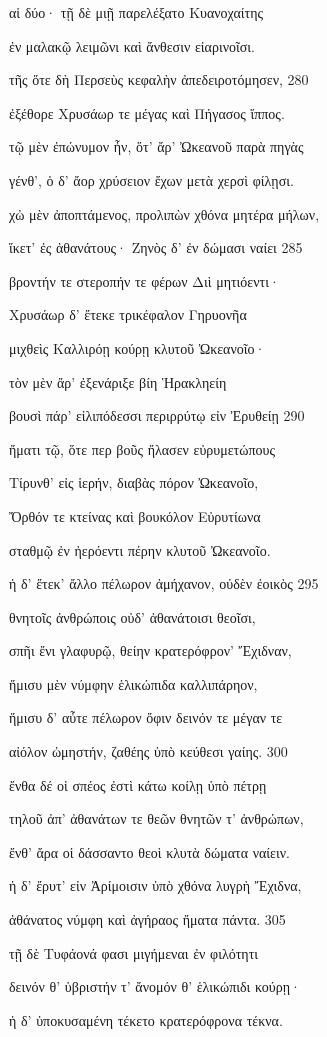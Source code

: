 αἱ δύο· τῇ δὲ μιῇ παρελέξατο Κυανοχαίτης 

ἐν μαλακῷ λειμῶνι καὶ ἄνθεσιν εἰαρινοῖσι. 

τῆς ὅτε δὴ Περσεὺς κεφαλὴν ἀπεδειροτόμησεν, 280 

ἐξέθορε Χρυσάωρ τε μέγας καὶ Πήγασος ἵππος.

τῷ μὲν ἐπώνυμον ἦν, ὅτ' ἄρ' Ὠκεανοῦ παρὰ πηγὰς

γένθ', ὁ δ' ἄορ χρύσειον ἔχων μετὰ χερσὶ φίλῃσι. 

χὠ μὲν ἀποπτάμενος, προλιπὼν χθόνα μητέρα μήλων,

ἵκετ' ἐς ἀθανάτους· Ζηνὸς δ' ἐν δώμασι ναίει 285 

βροντήν τε στεροπήν τε φέρων Διὶ μητιόεντι·

Χρυσάωρ δ' ἔτεκε τρικέφαλον Γηρυονῆα

μιχθεὶς Καλλιρόῃ κούρῃ κλυτοῦ Ὠκεανοῖο· 

τὸν μὲν ἄρ' ἐξενάριξε βίη Ἡρακληείη

βουσὶ πάρ' εἰλιπόδεσσι περιρρύτῳ εἰν Ἐρυθείῃ 290

ἤματι τῷ, ὅτε περ βοῦς ἤλασεν εὐρυμετώπους 

Τίρυνθ' εἰς ἱερήν, διαβὰς πόρον Ὠκεανοῖο, 

Ὄρθόν τε κτείνας καὶ βουκόλον Εὐρυτίωνα

σταθμῷ ἐν ἠερόεντι πέρην κλυτοῦ Ὠκεανοῖο.

ἡ δ' ἔτεκ' ἄλλο πέλωρον ἀμήχανον, οὐδὲν ἐοικὸς 295 

θνητοῖς ἀνθρώποις οὐδ' ἀθανάτοισι θεοῖσι, 

σπῆι ἔνι γλαφυρῷ, θείην κρατερόφρον' Ἔχιδναν, 

ἥμισυ μὲν νύμφην ἑλικώπιδα καλλιπάρηον, 

ἥμισυ δ' αὖτε πέλωρον ὄφιν δεινόν τε μέγαν τε

αἰόλον ὠμηστήν, ζαθέης ὑπὸ κεύθεσι γαίης. 300 

ἔνθα δέ οἱ σπέος ἐστὶ κάτω κοίλῃ ὑπὸ πέτρῃ

τηλοῦ ἀπ' ἀθανάτων τε θεῶν θνητῶν τ' ἀνθρώπων,

ἔνθ' ἄρα οἱ δάσσαντο θεοὶ κλυτὰ δώματα ναίειν.

ἡ δ' ἔρυτ' εἰν Ἀρίμοισιν ὑπὸ χθόνα λυγρὴ Ἔχιδνα, 

ἀθάνατος νύμφη καὶ ἀγήραος ἤματα πάντα. 305

τῇ δὲ Τυφάονά φασι μιγήμεναι ἐν φιλότητι

δεινόν θ' ὑβριστήν τ' ἄνομόν θ' ἑλικώπιδι κούρῃ· 

ἡ δ' ὑποκυσαμένη τέκετο κρατερόφρονα τέκνα.

